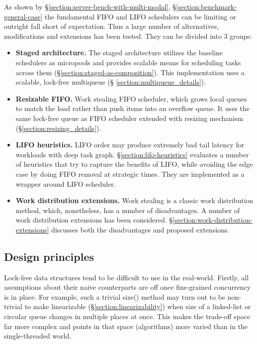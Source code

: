 \documentclass[12pt,a4paper,twoside]{report}
\begin{document}
As shown by \S\ref{section:server-bench-with-multi-modal}, \S\ref{section:benchmark-general-case} the fundamental FIFO and LIFO schedulers can be limiting or outright fall short of expectation. Thus a large number of alternatives, modifications and extensions has been tested. They can be divided into 3 groups:
\begin{itemize}
    \item \textbf{Staged architecture.} The staged architecture utilizes the baseline schedulers as micropools and provides scalable means for scheduling tasks across them (\S\ref{section:staged-as-composition}). This implementation uses a scalable, lock-free multiqueue (\S
    \ref{section:multiqueue_details}).
    \item \textbf{Resizable FIFO.} Work stealing FIFO scheduler, which grows local queues to match the load rather than push items into an overflow queue. It uses the same lock-free queue as FIFO scheduler extended with resizing mechanism (\S\ref{section:resizing_details}).
    \item \textbf{LIFO heuristics.} LIFO order may produce extremely bad tail latency for workloads with deep task graph. \S\ref{section:lifo-heuristics} evaluates a number of heuristics that try to capture the benefits of LIFO, while avoiding the edge case by doing FIFO removal at strategic times. They are implemented as a wrapper around LIFO scheduler.
    \item \textbf{Work distribution extensions.} Work stealing is a classic work distribution method, which, nonetheless, has a number of disadvantages. A number of work distribution extensions has been considered.  
    \S\ref{section:work-distribution-extensions} discusses both the disadvantages and proposed extensions. 
\end{itemize} 

\subsection{Design principles}
\label{section:lock-free-design-principles}

Lock-free data structures tend to be difficult to use in the real-world. Firstly, all assumptions about their naive counterparts are off once fine-grained concurrency is in place. For example, such a trivial size() method may turn out to be non-trivial to make linearizable (\S\ref{section:linearizability}) when size of a linked-list or circular queue changes in multiple places at once. This makes the trade-off space far more complex and points in that space (algorithms) more varied than in the single-threaded world.
\end{document}
